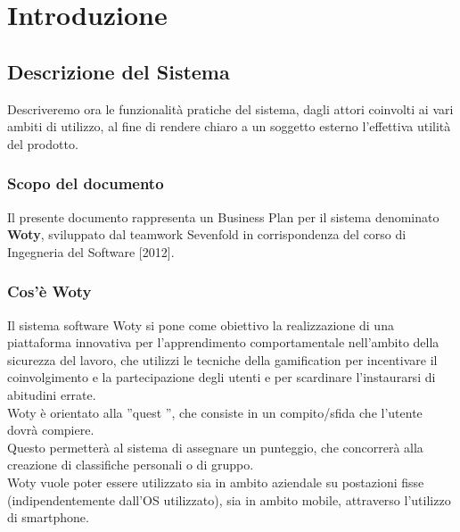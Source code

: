 



\newpage

\tableofcontents %

\let\cleardoublepage\clearpage %

\listoftables

\listoffigures




\newpage
\chapter{Introduzione}

\section{Descrizione del Sistema}

Descriveremo ora le funzionalità pratiche del sistema, dagli attori coinvolti ai vari ambiti di utilizzo, al fine di rendere chiaro a un soggetto esterno l'effettiva utilità del prodotto.

\subsection{Scopo del documento}
Il presente documento rappresenta un Business Plan per il sistema denominato \textbf{Woty},  sviluppato dal teamwork Sevenfold in corrispondenza del corso di Ingegneria del Software [2012].\\

\subsection{Cos'è Woty}

Il sistema software Woty si pone come obiettivo la realizzazione di una piattaforma innovativa per l’apprendimento comportamentale nell’ambito della sicurezza del lavoro, che utilizzi le tecniche della gamification per incentivare il coinvolgimento e la partecipazione degli utenti e per scardinare l’instaurarsi di abitudini errate.\\
Woty è orientato alla ”quest ”, che consiste in un compito/sfida che l’utente dovrà compiere.\\
Questo permetterà al sistema di assegnare un punteggio, che concorrerà alla creazione di classifiche personali o di gruppo.\\
Woty vuole poter essere utilizzato sia in ambito aziendale su postazioni fisse (indipendentemente dall’OS utilizzato), sia in ambito mobile, attraverso l’utilizzo di smartphone.\\

